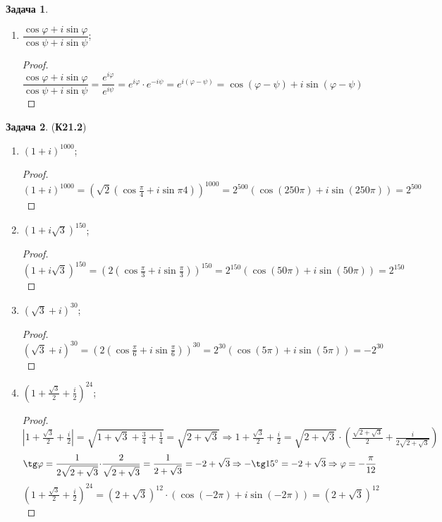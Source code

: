 \documentclass[12pt]{article}
\theoremstyle{definition}
\newtheorem{problem}{Задача}
\begin{document}
\begin{problem}
\begin{enumerate}[label=\asbuk*)]
		\item $\dfrac{\cos\varphi + i \sin\varphi}{\cos\psi + i\sin\psi}$;
		\begin{proof}
			$$
				\dfrac{\cos\varphi + i \sin\varphi}{\cos\psi + i\sin\psi} = \dfrac{e^{i\varphi}}{e^{i\psi}} = e^{i\varphi}{\cdot}e^{-i\psi} =e^{i(\varphi - \psi)} =\cos(\varphi - \psi) + i\sin(\varphi - \psi)
			$$
		\end{proof}
	\end{enumerate}
\end{problem}

\begin{problem}(\textbf{К21.2})
	\begin{enumerate}[label=\asbuk*)]
		\item $(1 + i)^{1000}$;
		\begin{proof}
			$$
				(1 + i)^{1000} = \left(\sqrt{2}\left(\cos\tfrac{\pi}{4} + i\sin{\pi}{4} \right)\right)^{1000} = 2^{500}(\cos(250\pi) + i\sin(250\pi)) = 2^{500}
			$$
		\end{proof}
		\item $(1 + i\sqrt{3})^{150}$;
		\begin{proof}
			$$
				(1 + i\sqrt{3})^{150} = \left(2\left(\cos\tfrac{\pi}{3} + i\sin\tfrac{\pi}{3}\right)\right)^{150} = 2^{150}\left(\cos(50\pi) + i\sin(50\pi)\right) = 2^{150}
			$$
		\end{proof}
		\item $(\sqrt{3} + i)^{30}$;
		\begin{proof}
			$$
				(\sqrt{3} + i)^{30} = \left(2\left(\cos\tfrac{\pi}{6} + i\sin\tfrac{\pi}{6}\right)\right)^{30} =2^{30}\left(\cos(5\pi) + i\sin(5\pi) \right) = -2^{30}
			$$	
		\end{proof}
		\item $\left(1 + \tfrac{\sqrt{3}}{2} + \tfrac{i}{2}\right)^{24}$;
		\begin{proof}
			$$
				\left|1 + \tfrac{\sqrt{3}}{2} + \tfrac{i}{2}\right| = \sqrt{1 + \sqrt{3} + \tfrac{3}{4} + \tfrac{1}{4}} = \sqrt{2 + \sqrt{3}} \Rightarrow 1 + \tfrac{\sqrt{3}}{2} + \tfrac{i}{2} = \sqrt{2 + \sqrt{3}}{\cdot}\left(\tfrac{\sqrt{2 + \sqrt{3}}}{2} + \tfrac{i}{2\sqrt{2 + \sqrt{3}}}\right)
			$$
			$$
				\tg\varphi = \dfrac{1}{2\sqrt{2 + \sqrt{3}}}{\cdot}\dfrac{2}{\sqrt{2 + \sqrt{3}}} = \dfrac{1}{2 + \sqrt{3}}= -2 + \sqrt{3} \Rightarrow -\tg 15^{\circ} = -2 + \sqrt{3} \Rightarrow \varphi = -\dfrac{\pi}{12}
			$$
			$$
				\left(1 + \tfrac{\sqrt{3}}{2} + \tfrac{i}{2}\right)^{24} = (2 + \sqrt{3})^{12}{\cdot}\left(\cos(-2\pi) + i\sin(-2\pi)\right)= (2 + \sqrt{3})^{12}
$$
\end{proof}
\end{enumerate}
\end{problem}
\end{document}
